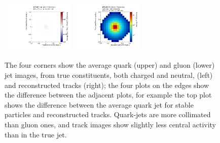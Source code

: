 \begin{figure}[htpb]
\begin{center}
\includegraphics[width=0.31\textwidth]{figures/CNN/diff_gluon_truth_track.pdf}
\includegraphics[width=0.31\textwidth]{figures/CNN/gluon_track.pdf}
\caption{The four corners show the average quark (upper) and gluon (lower) jet images, from true constituents, both charged and neutral, (left) and reconstructed tracks (right); the four plots on the edges show the difference between the adjacent plots, for example the top plot shows the difference between the average quark jet for stable particles and reconstructed tracks. Quark-jets are more collimated than gluon ones, and track images show slightly less central activity than in the true jet.}
\label{fig:cnn-avg:truthtrack}
\end{center}
\end{figure}

